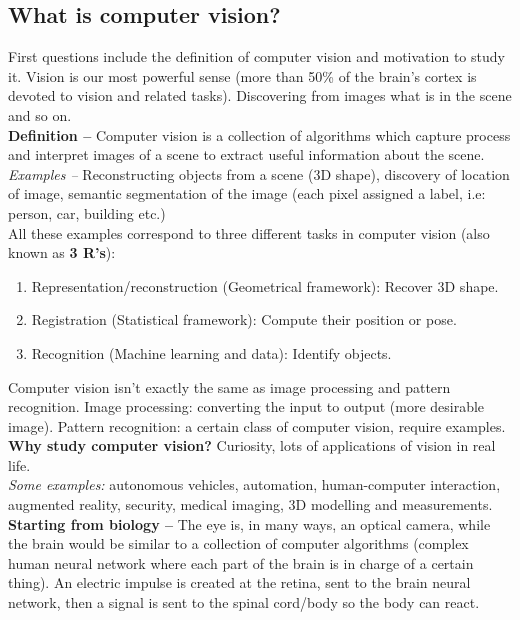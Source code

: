 \documentclass[a4paper,11pt]{article}
\begin{document}
\subsection{What is computer vision?}
First questions include the definition of computer vision and motivation to study it. Vision is our most powerful sense (more than 50\% of the brain's cortex is devoted to vision and related tasks). Discovering from images what is in the scene and so on.
\vspace{5pt}
\\
\textbf{Definition --} Computer vision is a collection of algorithms which capture process and interpret images of a scene to extract useful information about the scene.
\vspace{5pt}
\\
\textit{Examples --} Reconstructing objects from a scene (3D shape), discovery of location of image, semantic segmentation of the image (each pixel assigned a label, i.e: person, car, building etc.)\vspace{5pt}\\
All these examples correspond to three different tasks in computer vision (also known as \textbf{3 R's}):
\begin{enumerate}
	\item Representation/reconstruction (Geometrical framework): Recover 3D shape.
	\item Registration (Statistical framework): Compute their position or pose.
	\item Recognition (Machine learning and data): Identify objects.
\end{enumerate}
Computer vision isn't exactly the same as image processing and pattern recognition. Image processing: converting the input to output (more desirable image). Pattern recognition: a certain class of computer vision, require examples. \vspace{5pt}\\
\textbf{Why study computer vision?} Curiosity, lots of applications of vision in real life.\\
\textit{Some examples:} autonomous vehicles, automation, human-computer interaction, augmented reality, security, medical imaging, 3D modelling and measurements.\vspace{5pt}\\
\textbf{Starting from biology --} The eye is, in many ways, an optical camera, while the brain would be similar to a collection of computer algorithms (complex human neural network where each part of the brain is in charge of a certain thing). An electric impulse is created at the retina, sent to the brain neural network, then a signal is sent to the spinal cord/body so the body can react.\vspace{5pt}\\
\end{document}
